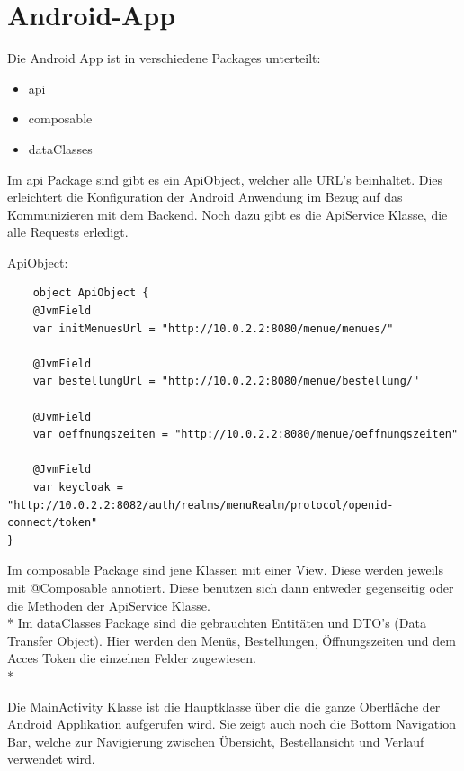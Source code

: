 \section{Android-App}


Die Android App ist in verschiedene Packages unterteilt: 

\begin{itemize}
    \item api
    \item composable 
    \item dataClasses
\end{itemize}

Im api Package sind gibt es ein ApiObject, welcher alle URL's beinhaltet. Dies erleichtert die Konfiguration der Android Anwendung im Bezug auf das Kommunizieren mit dem Backend.
Noch dazu gibt es die ApiService Klasse, die alle Requests erledigt. 


ApiObject:
\begin{lstlisting}
    object ApiObject {
    @JvmField
    var initMenuesUrl = "http://10.0.2.2:8080/menue/menues/"

    @JvmField
    var bestellungUrl = "http://10.0.2.2:8080/menue/bestellung/"

    @JvmField
    var oeffnungszeiten = "http://10.0.2.2:8080/menue/oeffnungszeiten"

    @JvmField
    var keycloak = "http://10.0.2.2:8082/auth/realms/menuRealm/protocol/openid-connect/token"
}
\end{lstlisting}



Im composable Package sind jene Klassen mit einer View. Diese werden jeweils mit @Composable annotiert. Diese benutzen sich dann
entweder gegenseitig oder die Methoden der ApiService Klasse.
\\*
Im dataClasses Package sind die gebrauchten Entitäten und DTO's (Data Transfer Object).
Hier werden den Menüs, Bestellungen, Öffnungszeiten und dem Acces Token die einzelnen Felder zugewiesen.
\\*

Die MainActivity Klasse ist die Hauptklasse über die die ganze Oberfläche der Android Applikation aufgerufen wird. 
Sie zeigt auch noch die Bottom Navigation Bar, welche zur Navigierung zwischen Übersicht, Bestellansicht und Verlauf verwendet wird.







\pagebreak


